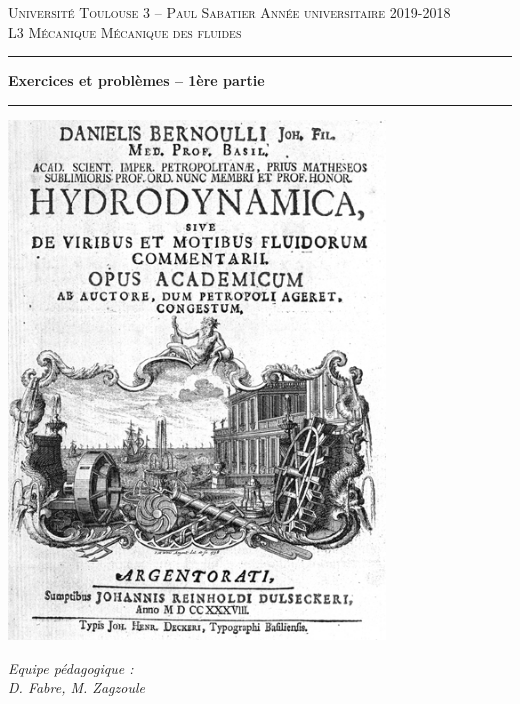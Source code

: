 \documentclass[10pt, a4paper]{article}
\begin{document}
                                          

\begin{titlepage}

\noindent
\textsc{Universit\'e Toulouse 3 -- Paul Sabatier \hfill Ann\'ee universitaire 2019-2018}
\\
\textsc{L3 M\'ecanique \hfill M\'ecanique des fluides}

\vspace{1cm}

\begin{center}
  \setlength{\unitlength}{1mm}
  \hrule height 1mm
  \vspace{6mm}
  \textbf{\LARGE Exercices et probl\`emes -- 1ère partie}
  \\ \vspace{5mm}
  \hrule height 1mm
  \vspace{2cm}
  \includegraphics[width=10cm]{bernoulli}
\end{center}

\vfill

\begin{flushright}
  \large{\textsl{Equipe p\'edagogique : \\
      D. Fabre, M. Zagzoule}}
\end{flushright}

\end{titlepage}

\tableofcontents








\appendix
%
\end{document}

